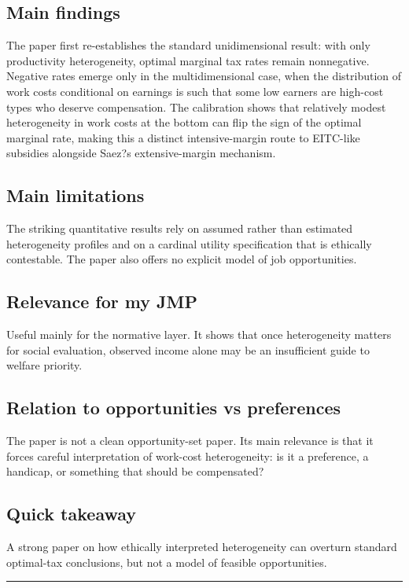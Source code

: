 \documentclass[11pt,a4paper]{article}
\begin{document}
\subsection*{Main findings}
The paper first re-establishes the standard unidimensional result: with only productivity heterogeneity, optimal marginal tax rates remain nonnegative. Negative rates emerge only in the multidimensional case, when the distribution of work costs conditional on earnings is such that some low earners are high-cost types who deserve compensation. The calibration shows that relatively modest heterogeneity in work costs at the bottom can flip the sign of the optimal marginal rate, making this a distinct intensive-margin route to EITC-like subsidies alongside Saez?s extensive-margin mechanism.

\subsection*{Main limitations}
The striking quantitative results rely on assumed rather than estimated heterogeneity profiles and on a cardinal utility specification that is ethically contestable. The paper also offers no explicit model of job opportunities.

\subsection*{Relevance for my JMP}
Useful mainly for the normative layer. It shows that once heterogeneity matters for social evaluation, observed income alone may be an insufficient guide to welfare priority.

\subsection*{Relation to opportunities vs preferences}
The paper is not a clean opportunity-set paper. Its main relevance is that it forces careful interpretation of work-cost heterogeneity: is it a preference, a handicap, or something that should be compensated?

\subsection*{Quick takeaway}
A strong paper on how ethically interpreted heterogeneity can overturn standard optimal-tax conclusions, but not a model of feasible opportunities.


\medskip\hrule\medskip
\end{document}
